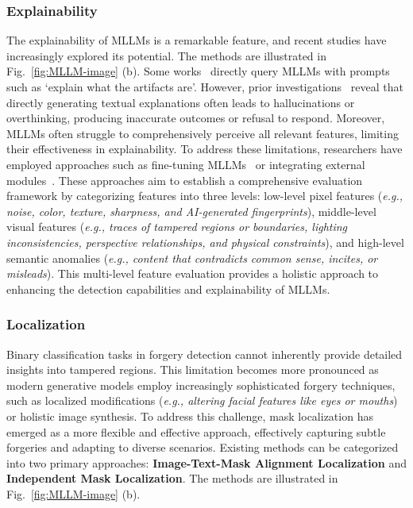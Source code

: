 \subsubsection{\textbf{Explainability}}
The explainability of MLLMs is a remarkable feature, and recent studies have increasingly explored its potential. The methods are illustrated in Fig.~\ref{fig:MLLM-image} (b). Some works~\cite{jia2024can,shi2024shield,lian2024large,huang2024sida} directly query MLLMs with prompts such as `explain what the artifacts are'. However, prior investigations~\cite{jia2024can, shi2024shield} reveal that directly generating textual explanations often leads to hallucinations or overthinking, producing inaccurate outcomes or refusal to respond. Moreover, MLLMs often struggle to comprehensively perceive all relevant features, limiting their effectiveness in explainability. To address these limitations, researchers have employed approaches such as fine-tuning MLLMs~\cite{chen2024textit, huang2024ffaa, xu2024fakeshield} or integrating external modules~\cite{sun2024forgerysleuth}. These approaches aim to establish a comprehensive evaluation framework by categorizing features into three levels: low-level pixel features (\textit{e.g., noise, color, texture, sharpness, and AI-generated fingerprints}), middle-level visual features (\textit{e.g., traces of tampered regions or boundaries, lighting inconsistencies, perspective relationships, and physical constraints}), and high-level semantic anomalies (\textit{e.g., content that contradicts common sense, incites, or misleads}). This multi-level feature evaluation provides a holistic approach to enhancing the detection capabilities and explainability of MLLMs.


\subsubsection{\textbf{Localization}}
Binary classification tasks in forgery detection cannot inherently provide detailed insights into tampered regions. This limitation becomes more pronounced as modern generative models employ increasingly sophisticated forgery techniques, such as localized modifications (\textit{e.g., altering facial features like eyes or mouths}) or holistic image synthesis. To address this challenge, mask localization has emerged as a more flexible and effective approach, effectively capturing subtle forgeries and adapting to diverse scenarios. Existing methods can be categorized into two primary approaches: \textbf{Image-Text-Mask Alignment Localization} and \textbf{Independent Mask Localization}. The methods are illustrated in Fig.~\ref{fig:MLLM-image} (b).

